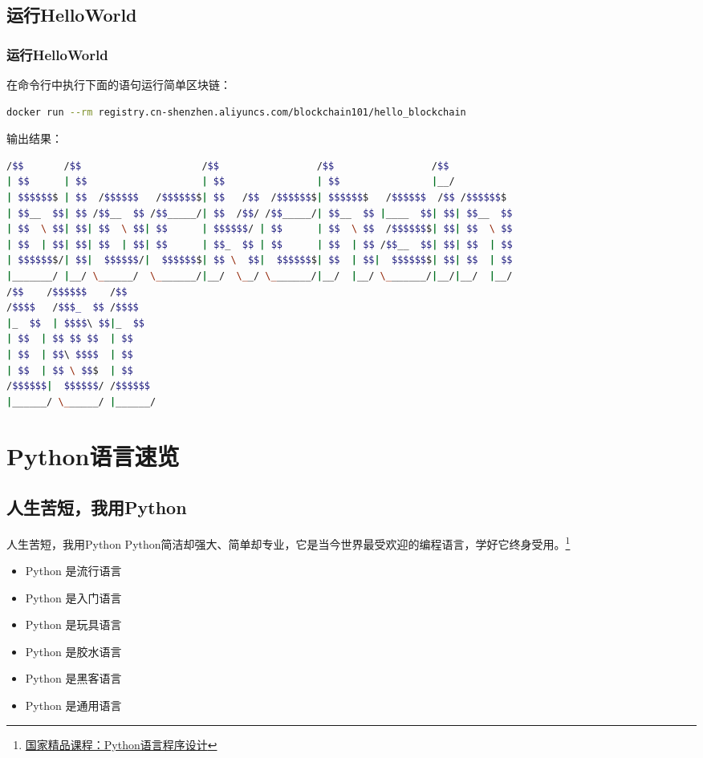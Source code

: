 \documentclass[11pt]{beamer}
\begin{document}
\subsection{运行HelloWorld}
\begin{frame}[fragile]
	\frametitle{运行HelloWorld}
	在命令行中执行下面的语句运行简单区块链：
	\begin{lstlisting}[language=sh,numbers=none,basicstyle=\fontsize{7}{9}\ttfamily]
docker run --rm registry.cn-shenzhen.aliyuncs.com/blockchain101/hello_blockchain
\end{lstlisting}
输出结果：
	\begin{lstlisting}[language=sh,basicstyle=\fontsize{6}{8}\ttfamily]
/$$       /$$                     /$$                 /$$                 /$$          
| $$      | $$                    | $$                | $$                |__/          
| $$$$$$$ | $$  /$$$$$$   /$$$$$$$| $$   /$$  /$$$$$$$| $$$$$$$   /$$$$$$  /$$ /$$$$$$$ 
| $$__  $$| $$ /$$__  $$ /$$_____/| $$  /$$/ /$$_____/| $$__  $$ |____  $$| $$| $$__  $$
| $$  \ $$| $$| $$  \ $$| $$      | $$$$$$/ | $$      | $$  \ $$  /$$$$$$$| $$| $$  \ $$
| $$  | $$| $$| $$  | $$| $$      | $$_  $$ | $$      | $$  | $$ /$$__  $$| $$| $$  | $$
| $$$$$$$/| $$|  $$$$$$/|  $$$$$$$| $$ \  $$|  $$$$$$$| $$  | $$|  $$$$$$$| $$| $$  | $$
|_______/ |__/ \______/  \_______/|__/  \__/ \_______/|__/  |__/ \_______/|__/|__/  |__/
/$$    /$$$$$$    /$$                                  
/$$$$   /$$$_  $$ /$$$$                                  
|_  $$  | $$$$\ $$|_  $$                                  
| $$  | $$ $$ $$  | $$                                  
| $$  | $$\ $$$$  | $$                                  
| $$  | $$ \ $$$  | $$                                  
/$$$$$$|  $$$$$$/ /$$$$$$                                
|______/ \______/ |______/                                
\end{lstlisting}
\end{frame}

\section{Python语言速览}
\subsection{人生苦短，我用Python}
\begin{frame}{人生苦短，我用Python}
	Python简洁却强大、简单却专业，它是当今世界最受欢迎的编程语言，学好它终身受用。\footnote{\href{http://www.icourse163.org/course/BIT-268001}{国家精品课程：Python语言程序设计}}
	\begin{multicols}{2}
		\begin{itemize}
			\item	Python 是流行语言
			\item	Python 是入门语言
			\item	Python 是玩具语言
			\item	Python 是胶水语言
			\item	Python 是黑客语言
			\item	Python 是通用语言
		\end{itemize}
	\end{multicols}
\end{frame}
\end{document}

